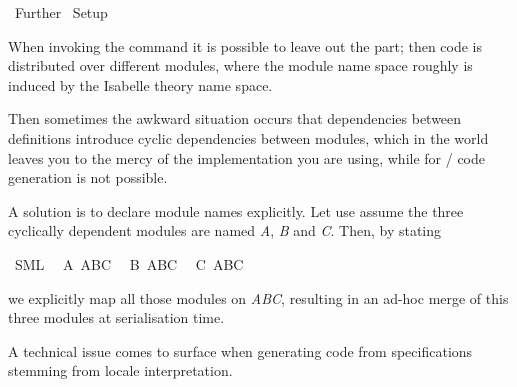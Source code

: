 %
\begin{isabellebody}%
\def\isabellecontext{Further}%
%
\isadelimtheory
%
\endisadelimtheory
%
\isatagtheory
{}\isamarkupfalse%
\ Further\isanewline
{}\ Setup\isanewline
{}%
\endisatagtheory
{\isafoldtheory}%
%
\isadelimtheory
%
\endisadelimtheory
%
\isamarkuptrue%
%
\isamarkuptrue%
%
\begin{isamarkuptext}%
When invoking the \hyperlink{command.export-code}{\mbox{}} command it is possible to
  leave out the \hyperlink{keyword.module-name}{\mbox{}} part; then code is
  distributed over different modules, where the module name space
  roughly is induced by the Isabelle theory name space.

  Then sometimes the awkward situation occurs that dependencies
  between definitions introduce cyclic dependencies between modules,
  which in the  world leaves you to the mercy of the
   implementation you are using, while for / code generation is not possible.

  A solution is to declare module names explicitly.  Let use assume
  the three cyclically dependent modules are named \emph{A}, \emph{B}
  and \emph{C}.  Then, by stating%
\end{isamarkuptext}%
\isamarkuptrue%
%
\isadelimquote
%
\endisadelimquote
%
\isatagquote
{}\isamarkupfalse%
\ SML\isanewline
\ \ A\ ABC\isanewline
\ \ B\ ABC\isanewline
\ \ C\ ABC%
\endisatagquote
{\isafoldquote}%
%
\isadelimquote
%
\endisadelimquote
%
\begin{isamarkuptext}%
\noindent we explicitly map all those modules on \emph{ABC},
  resulting in an ad-hoc merge of this three modules at serialisation
  time.%
\end{isamarkuptext}%
\isamarkuptrue%
%
\isamarkuptrue%
%
\begin{isamarkuptext}%
A technical issue comes to surface when generating code from
  specifications stemming from locale interpretation.


\end{isamarkuptext}
\end{isabellebody}
